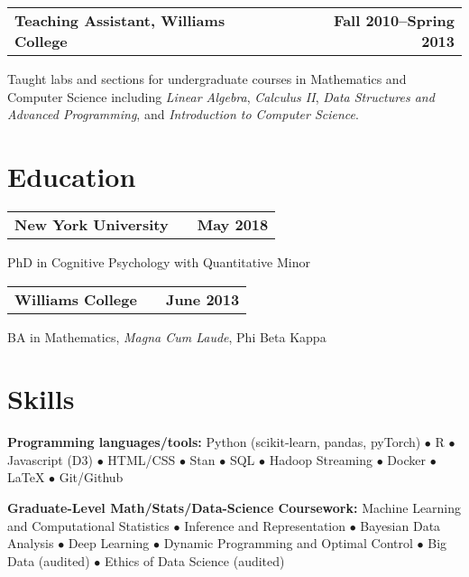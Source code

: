 \documentclass[10pt]{resume}
\begin{document}
\begin{addmargin}[1em]{0em}
\begin{tabular}{@{} L M R}
  \textbf{Teaching Assistant, Williams College}& &\textbf{Fall 2010--Spring 2013}\\
\end{tabular}\vspace{-1em}
  Taught labs and sections for undergraduate courses in Mathematics and Computer Science
  including \emph{Linear Algebra}, \emph{Calculus II}, \emph{Data Structures and Advanced
  Programming}, and \emph{Introduction to Computer Science}.

\end{addmargin}

\section{Education}

\hrulefill

\begin{addmargin}[1em]{0em}

\begin{tabular}{@{} L M R}
  \textbf{New York University}& &\textbf{May 2018}\\
\end{tabular}\vspace{-1em}
  PhD in Cognitive Psychology with Quantitative Minor

\begin{tabular}{@{} L M R}
  \textbf{Williams College}& &\textbf{June 2013}\\
\end{tabular}\vspace{-1em}
  BA in Mathematics, \emph{Magna Cum Laude}, Phi Beta Kappa

\end{addmargin}

\section{Skills}

\hrulefill

\begin{addmargin}[1em]{0em}
\textbf{Programming languages/tools:}
Python (scikit-learn, pandas, pyTorch) $\bullet$ R $\bullet$ Javascript (D3)
$\bullet$ HTML/CSS $\bullet$ Stan $\bullet$ SQL $\bullet$
Hadoop Streaming $\bullet$ Docker $\bullet$ LaTeX $\bullet$ Git/Github

\textbf{Graduate-Level Math/Stats/Data-Science Coursework:}
Machine Learning and Computational Statistics $\bullet$ Inference and
Representation $\bullet$ Bayesian Data Analysis $\bullet$ Deep Learning
$\bullet$ Dynamic Programming and Optimal Control $\bullet$
Big Data (audited) $\bullet$ Ethics of Data Science (audited)

\end{addmargin}
\end{document}

